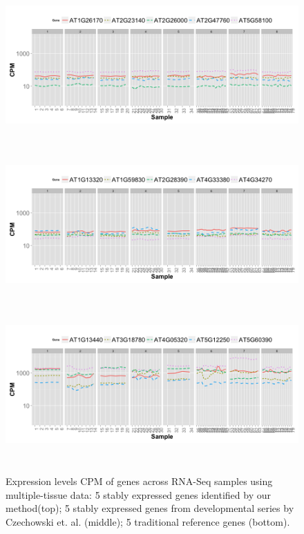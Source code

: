 \documentclass[11pt, a4paper]{article}
\begin{document}

 \begin{figure}[H]
\begin{center}
	\includegraphics[width=15cm,height=6cm]{Figures/A3.png}
	\includegraphics[width=15cm,height=6cm]{Figures/A2.png}
	\includegraphics[width=15cm,height=6cm]{Figures/A1.png}
	\caption{{\small{\label{expressinlevel1} Expression levels CPM of genes across RNA-Seq samples using multiple-tissue data: 5 stably expressed genes identified by our method(top)}; 5 stably expressed genes from developmental series by Czechowski et. al. (middle); 5 traditional reference genes (bottom).}}
\end{center}
\end{figure} 
\end{document}
